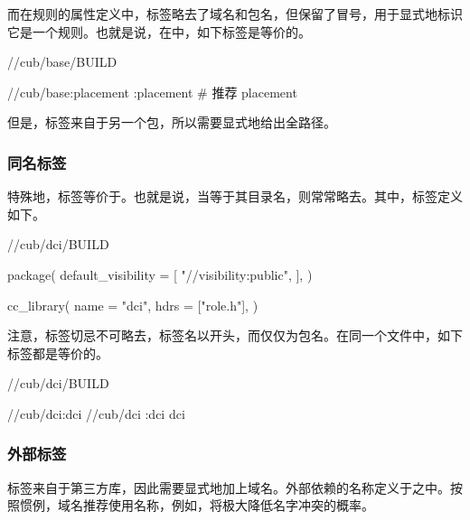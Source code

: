 \begin{content}
而在规则的属性定义中，标签略去了域名和包名，但保留了冒号，用于显式地标识它是一个规则。也就是说，在中，如下标签是等价的。

\begin{nodiff}{//cub/base/BUILD}
 \begin{python}
//cub/base:placement
:placement  # 推荐
placement
 \end{python}
\end{nodiff}

但是，标签来自于另一个包，所以需要显式地给出全路径。

\subsubsection{同名标签}

特殊地，标签等价于。也就是说，当等于其目录名，则常常略去。其中，标签定义如下。

\begin{nodiff}{//cub/dci/BUILD}
 \begin{python}
package(
    default_visibility = [    
        "//visibility:public",    
    ],
)

cc_library(
    name = "dci",
    hdrs = ["role.h"],
)
 \end{python}
\end{nodiff}

注意，标签切忌不可略去\ascii{//}，标签名以\ascii{//}开头，而仅仅为包名。在同一个文件中，如下标签都是等价的。

\begin{nodiff}{//cub/dci/BUILD}
 \begin{python}
//cub/dci:dci
//cub/dci
:dci
dci
 \end{python}
\end{nodiff}

\subsubsection{外部标签}

标签来自于第三方库，因此需要显式地加上域名。外部依赖的名称定义于之中。按照惯例，域名推荐使用名称，例如，将极大降低名字冲突的概率。


\end{content}
